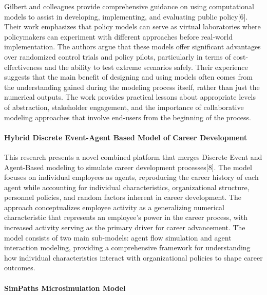\documentclass[main.tex]{subfiles}
\begin{document}
Gilbert and colleagues provide comprehensive guidance on using computational models to assist in developing, implementing, and evaluating public policy[6]. Their work emphasizes that policy models can serve as virtual laboratories where policymakers can experiment with different approaches before real-world implementation. The authors argue that these models offer significant advantages over randomized control trials and policy pilots, particularly in terms of cost-effectiveness and the ability to test extreme scenarios safely. Their experience suggests that the main benefit of designing and using models often comes from the understanding gained during the modeling process itself, rather than just the numerical outputs. The work provides practical lessons about appropriate levels of abstraction, stakeholder engagement, and the importance of collaborative modeling approaches that involve end-users from the beginning of the process.

\paragraph{Hybrid Discrete Event-Agent Based Model of Career Development}

This research presents a novel combined platform that merges Discrete Event and Agent-Based modeling to simulate career development processes[8]. The model focuses on individual employees as agents, reproducing the career history of each agent while accounting for individual characteristics, organizational structure, personnel policies, and random factors inherent in career development. The approach conceptualizes employee activity as a generalizing numerical characteristic that represents an employee's power in the career process, with increased activity serving as the primary driver for career advancement. The model consists of two main sub-models: agent flow simulation and agent interaction modeling, providing a comprehensive framework for understanding how individual characteristics interact with organizational policies to shape career outcomes.

\paragraph{SimPaths Microsimulation Model}
\end{document}
